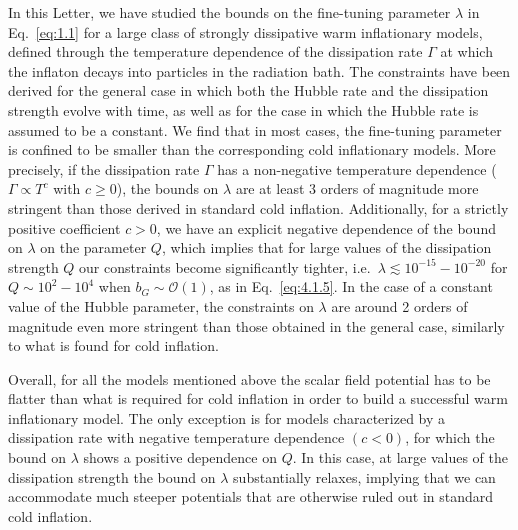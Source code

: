\documentclass[aps,prd,twocolumn,amssymb,amsmath,floatfix,nofootinbib,superscriptaddress,preprintnumbers]{revtex4-1}
\begin{document}
In this Letter, we have studied the bounds on the fine-tuning parameter $\lambda$ in Eq.~\ref{eq:1.1} for a large class of strongly dissipative warm inflationary models, defined through the temperature dependence of the dissipation rate $\Gamma$ at which the inflaton decays into particles in the radiation bath. The constraints have been derived for the general case in which both the Hubble rate and the dissipation strength evolve with time, as well as for the case in which the Hubble rate is assumed to be a constant. We find that in most cases, the fine-tuning parameter is confined to be smaller than the corresponding cold inflationary models. More precisely, if the dissipation rate $\Gamma$ has a non-negative temperature dependence ($\Gamma \propto T^c$ with $c\geq 0$), the bounds on $\lambda$ are at least 3 orders of magnitude more stringent than those derived in standard cold inflation. Additionally, for a strictly positive coefficient $c>0$, we have an explicit negative dependence of the bound on $\lambda$ on the parameter $Q$, which implies that for large values of the dissipation strength $Q$ our constraints become significantly tighter, i.e.\ $\lambda\lesssim 10^{-15}-10^{-20}$ for $Q\sim 10^{2}-10^{4}$ when $b_G\sim \mathcal{O}(1)$, as in Eq.~\ref{eq:4.1.5}. In the case of a constant value of the Hubble parameter, the constraints on $\lambda$ are around 2 orders of magnitude even more stringent than those obtained in the general case, similarly to what is found for cold inflation. 

Overall, for all the models mentioned above the scalar field potential has to be flatter than what is required for cold inflation in order to build a successful warm inflationary model. The only exception is for models characterized by a dissipation rate with negative temperature dependence $(c<0)$, for which the bound on $\lambda$ shows a positive dependence on $Q$. In this case, at large  values of the dissipation strength the bound on $\lambda$ substantially relaxes, implying that we can accommodate much steeper potentials that are otherwise ruled out in standard cold inflation.
\end{document}
